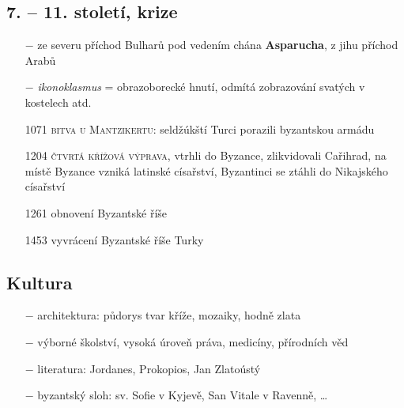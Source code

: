 \documentclass{article}
\begin{document}
\subsection*{7. -- 11. století, krize}
\begin{itemize}
    \vspace{-0.5em}
    \setlength\itemsep{0.15em}
    \item[$-$] ze severu příchod Bulharů pod vedením chána \textbf{Asparucha}, z jihu příchod Arabů
    \item[$-$] \textit{ikonoklasmus} = obrazoborecké hnutí, odmítá zobrazování svatých v kostelech atd.
    \item[1071] \textsc{bitva u Mantzikertu}: seldžúkští Turci porazili byzantskou armádu
    \item[1204] \textsc{čtvrtá křížová výprava}, vtrhli do Byzance, zlikvidovali Cařihrad, na místě Byzance vzniká latinské císařství, Byzantinci se ztáhli do Nikajského císařství
    \item[1261] obnovení Byzantské říše
    \item[1453] vyvrácení Byzantské říše Turky
\end{itemize}

\subsection*{Kultura}
\begin{itemize}
    \vspace{-0.5em}
    \setlength\itemsep{0.15em}
    \item[$-$] architektura: půdorys tvar kříže, mozaiky, hodně zlata
    \item[$-$] výborné školství, vysoká úroveň práva, medicíny, přírodních věd
    \item[$-$] literatura: Jordanes, Prokopios, Jan Zlatoústý
    \item[$-$] byzantský sloh: sv. Sofie v Kyjevě, San Vitale v Ravenně, \dots
\end{itemize}
\end{document}
